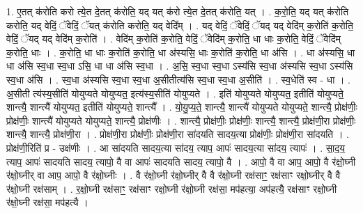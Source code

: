 \documentclass[17pt]{extarticle}
\begin{document}
1. ए॒तत् क॑रोति करो त्ये॒त दे॒तत् क॑रोति॒ यद् यत् क॑रो त्ये॒त दे॒तत् क॑रोति॒ यत् । . क॒रो॒ति॒ यद् यत् क॑रोति करोति॒ यद् वेदिं॒ ॅवेदिं॒ ॅयत् क॑रोति करोति॒ यद् वेदि᳚म् । . यद् वेदिं॒ ॅवेदिं॒ ॅयद् यद् वेदि॑म् क॒रोति॑ क॒रोति॒ वेदिं॒ ॅयद् यद् वेदि॑म् क॒रोति॑ । . वेदि॑म् क॒रोति॑ क॒रोति॒ वेदिं॒ ॅवेदि॑म् क॒रोति॒ धा धाः क॒रोति॒ वेदिं॒ ॅवेदि॑म् क॒रोति॒ धाः । . क॒रोति॒ धा धाः क॒रोति॑ क॒रोति॒ धा अ॑स्यसि॒ धाः क॒रोति॑ क॒रोति॒ धा अ॑सि । . धा अ॑स्यसि॒ धा धा अ॑सि स्व॒धा स्व॒धा ऽसि॒ धा धा अ॑सि स्व॒धा । . अ॒सि॒ स्व॒धा स्व॒धा ऽस्य॑सि स्व॒धा अ॑स्यसि स्व॒धा ऽस्य॑सि स्व॒धा अ॑सि । . स्व॒धा अ॑स्यसि स्व॒धा स्व॒धा अ॒सीतीत्य॑सि स्व॒धा स्व॒धा अ॒सीति॑ । . स्व॒धेति॑ स्व - धा । . अ॒सीती त्य॑स्य॒सीति॑ योयुप्यते योयुप्यत॒ इत्य॑स्य॒सीति॑ योयुप्यते । . इति॑ योयुप्यते योयुप्यत॒ इतीति॑ योयुप्यते॒ शान्त्यै॒ शान्त्यै॑ योयुप्यत॒ इतीति॑ योयुप्यते॒ शान्त्यै᳚ । . यो॒यु॒प्य॒ते॒ शान्त्यै॒ शान्त्यै॑ योयुप्यते योयुप्यते॒ शान्त्यै॒ प्रोक्ष॑णीः॒ प्रोक्ष॑णीः॒ शान्त्यै॑ योयुप्यते योयुप्यते॒ शान्त्यै॒ प्रोक्ष॑णीः । . शान्त्यै॒ प्रोक्ष॑णीः॒ प्रोक्ष॑णीः॒ शान्त्यै॒ शान्त्यै॒ प्रोक्ष॑णी॒रा प्रोक्ष॑णीः॒ शान्त्यै॒ शान्त्यै॒ प्रोक्ष॑णी॒रा । . प्रोक्ष॑णी॒रा प्रोक्ष॑णीः॒ प्रोक्ष॑णी॒रा सा॑दयति सादय॒त्या प्रोक्ष॑णीः॒ प्रोक्ष॑णी॒रा सा॑दयति । . प्रोक्ष॑णी॒रिति॑ प्र - उक्ष॑णीः । . आ सा॑दयति सादय॒त्या सा॑दय॒ त्याप॒ आपः॑ सादय॒त्या सा॑दय॒ त्यापः॑ । . सा॒द॒य॒ त्याप॒ आपः॑ सादयति सादय॒ त्यापो॒ वै वा आपः॑ सादयति सादय॒ त्यापो॒ वै । . आपो॒ वै वा आप॒ आपो॒ वै र॑क्षो॒घ्नी र॑क्षो॒घ्नीर् वा आप॒ आपो॒ वै र॑क्षो॒घ्नीः । . वै र॑क्षो॒घ्नी र॑क्षो॒घ्नीर् वै वै र॑क्षो॒घ्नी रक्ष॑साꣳ॒॒ रक्ष॑साꣳ रक्षो॒घ्नीर् वै वै र॑क्षो॒घ्नी रक्ष॑साम् । . र॒क्षो॒घ्नी रक्ष॑साꣳ॒॒ रक्ष॑साꣳ रक्षो॒घ्नी र॑क्षो॒घ्नी रक्ष॑सा॒ मप॑हत्या॒ अप॑हत्यै॒ रक्ष॑साꣳ रक्षो॒घ्नी र॑क्षो॒घ्नी रक्ष॑सा॒ मप॑हत्यै । \newline
\end{document}
